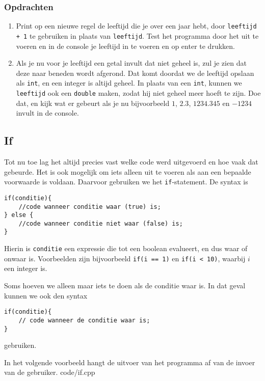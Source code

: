 \documentclass[12pt,a4paper]{article}
\newcommand{\code}{}
\newcommand{\icode}{\lstinline}
\begin{document}
\subsubsection{Opdrachten}
\begin{enumerate}
	\item Print op een nieuwe regel de leeftijd die je over een jaar hebt, door \icode{leeftijd + 1} te gebruiken in plaats van \icode{leeftijd}.
		Test het programma door het uit te voeren en in de console je leeftijd in te voeren en op enter te drukken.
	\item
		Als je nu voor je leeftijd een getal invult dat niet geheel is, zul je zien dat deze naar beneden wordt afgerond. Dat komt doordat we de leeftijd opslaan als \icode{int}, en een integer is altijd geheel.
		In plaats van een \icode{int}, kunnen we \icode{leeftijd} ook een \icode{double} maken, zodat hij niet geheel meer hoeft te zijn. Doe dat, en kijk wat er gebeurt als je nu bijvoorbeeld $1$, $2.3$, $1234.345$ en $-1234$ invult in de console.
\end{enumerate}


\subsection{If}
Tot nu toe lag het altijd precies vast welke code werd uitgevoerd en hoe vaak dat gebeurde. Het is ook mogelijk om iets alleen uit te voeren als aan een bepaalde voorwaarde is voldaan. Daarvoor gebruiken we het \icode{if}-statement. De syntax is
\begin{lstlisting}
if(conditie){
	//code wanneer conditie waar (true) is;
} else {
	//code wanneer conditie niet waar (false) is;
}
\end{lstlisting}
Hierin is \icode{conditie} een expressie die tot een boolean evalueert, en dus waar of onwaar is. Voorbeelden zijn bijvoorbeeld \icode{if(i == 1)} en \icode{if(i < 10)}, waarbij $i$ een integer is. 

Soms hoeven we alleen maar iets te doen als de conditie waar is. In dat geval kunnen we ook den syntax
\begin{lstlisting}
if(conditie){
	// code wanneer de conditie waar is;
}
\end{lstlisting}
gebruiken.

In het volgende voorbeeld hangt de uitvoer van het programma af van de invoer van de gebruiker.
\code{code/if.cpp}
\end{document}
